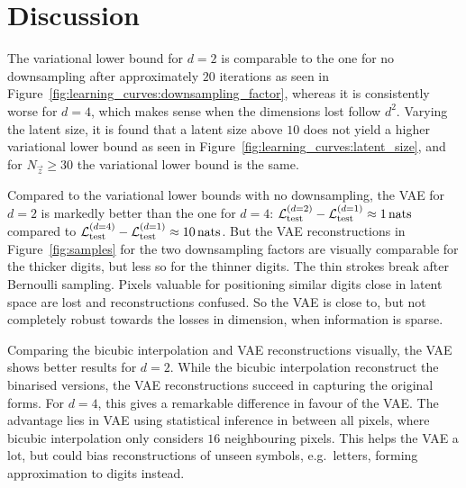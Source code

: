 \section{Discussion}
\label{sec:discussion}

The variational lower bound for $d = 2$ is comparable to the one for no downsampling after approximately $20$ iterations as seen in Figure~\ref{fig:learning_curves:downsampling_factor}, whereas it is consistently worse for $d = 4$, which makes sense when the dimensions lost follow $d^2$.
Varying the latent size, it is found that a latent size above $10$ does not yield a higher variational lower bound as seen in Figure~\ref{fig:learning_curves:latent_size}, and for $N_{\vec{z}} \geq 30$ the variational lower bound is the same.

Compared to the variational lower bounds with no downsampling, the VAE for $d = 2$ is markedly better than the one for $d = 4$: $\mathcal{L}_{\text{test}}^{(d = 2)} - \mathcal{L}_{\text{test}}^{(d = 1)} \approx \SI{1}{nats}$ compared to $\mathcal{L}_{\text{test}}^{(d = 4)} - \mathcal{L}_{\text{test}}^{(d = 1)} \approx \SI{10}{nats}$.
But the VAE reconstructions in Figure~\ref{fig:samples} for the two downsampling factors are visually comparable for the thicker digits, but less so for the thinner digits. The thin strokes break after Bernoulli sampling. Pixels valuable for positioning similar digits close in latent space are lost and reconstructions confused.  
So the VAE is close to, but not completely robust towards the losses in dimension, when information is sparse. 

Comparing the bicubic interpolation and VAE reconstructions visually, the VAE shows better results for $d = 2$.
While the bicubic interpolation reconstruct the binarised versions, the VAE reconstructions succeed in capturing the original forms.
For $d = 4$, this gives a remarkable difference in favour of the VAE.
The advantage lies in VAE using statistical inference in between all pixels, where bicubic interpolation only considers $16$ neighbouring pixels. This helps the VAE a lot, but could bias reconstructions of unseen symbols, e.g.\ letters, forming approximation to digits instead.
